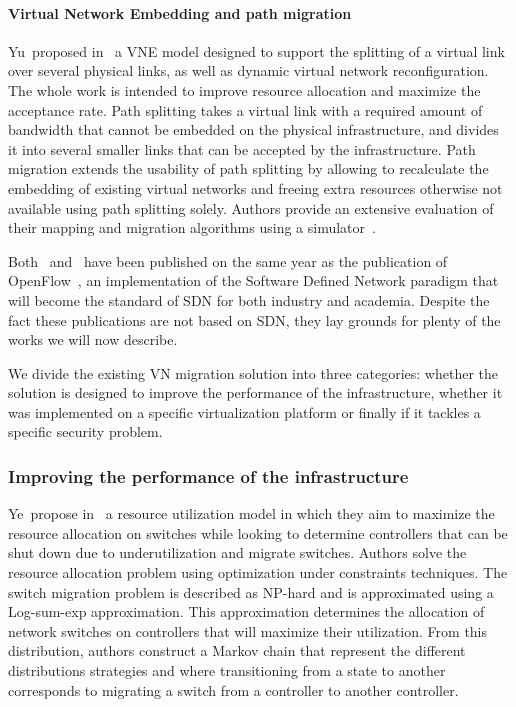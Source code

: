 \paragraph{Virtual Network Embedding and path migration}
Yu~\etal proposed in~\cite{VNE-Yu2008} a VNE model designed to support the splitting of a virtual link over several physical links, as well as dynamic virtual network reconfiguration.
The whole work is intended to improve resource allocation and maximize the acceptance rate. 
Path splitting takes a virtual link with a required amount of bandwidth that cannot be embedded on the physical infrastructure, and divides it into several smaller links that can be accepted by the infrastructure.
Path migration extends the usability of path splitting by allowing to recalculate the embedding of existing virtual networks and freeing extra resources otherwise not available using path splitting solely.
Authors provide an extensive evaluation of their mapping and migration algorithms using a simulator~\cite{vnesimulator}.

Both~\cite{VROOM-Wang2008} and~\cite{VNE-Yu2008} have been published on the same year as the publication of OpenFlow~\cite{Openflow-McKeown2008}, an implementation of the Software Defined Network paradigm that will become the standard of SDN for both industry and academia.
Despite the fact these publications are not based on SDN, they lay grounds for plenty of the works we will now describe.

We divide the existing VN migration solution into three categories: whether the solution is designed to improve the performance of the infrastructure, whether it was implemented on a specific virtualization platform or finally if it tackles a specific security problem.

\subsubsection{Improving the performance of the infrastructure}
Ye~\etal propose in~\cite{Ye2017a} a resource utilization model in which they aim to maximize the resource allocation on switches while looking to determine controllers that can be shut down due to underutilization and migrate switches.
Authors solve the resource allocation problem using optimization under constraints techniques. 
The switch migration problem is described as NP-hard and is approximated using a Log-sum-exp approximation.
This approximation determines the allocation of network switches on controllers that will maximize their utilization. 
From this distribution, authors construct a Markov chain that represent the different distributions strategies and where transitioning from a state to another corresponds to migrating a switch from a controller to another controller.

